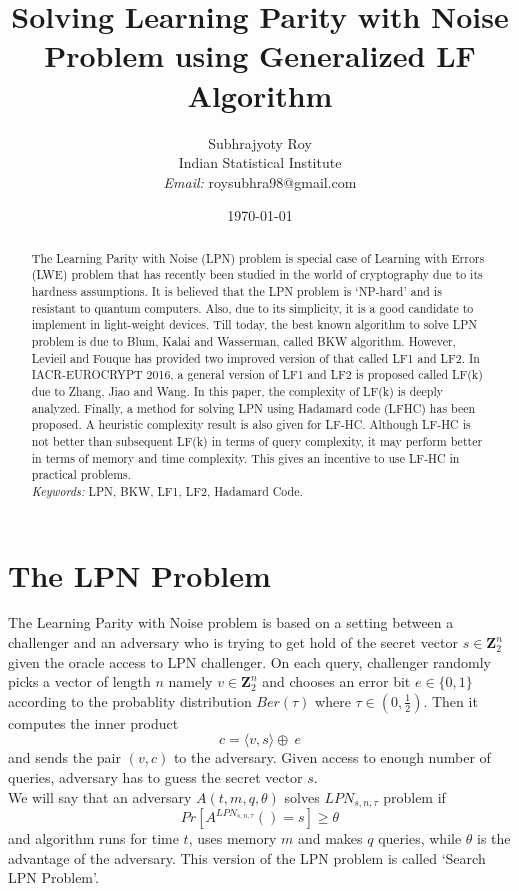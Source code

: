 \documentclass{article}
\title{Solving Learning Parity with Noise Problem using Generalized LF Algorithm}
\author{Subhrajyoty Roy\\
        Indian Statistical Institute\\
       \emph{Email:} roysubhra98@gmail.com}
\date{\today}
\begin{document}
	\maketitle

\begin{abstract}
	The Learning Parity with Noise (LPN) problem is special case of Learning with Errors (LWE) problem that has recently been studied in the world of cryptography due to its hardness assumptions. It is believed that the LPN problem is `NP-hard' and is resistant to quantum computers. Also, due to its simplicity, it is a good candidate to implement in light-weight devices.
	Till today, the best known algorithm to solve LPN problem is due to Blum, Kalai and Wasserman, called BKW algorithm. However, Levieil and Fouque has provided two improved version of that called LF1 and LF2. In IACR-EUROCRYPT 2016, a general version of LF1 and LF2 is proposed called LF(k) due to Zhang, Jiao and Wang. In this paper, the complexity of LF(k) is deeply analyzed. Finally, a method for solving LPN using Hadamard code (LFHC) has been proposed. A heuristic complexity result is also given for LF-HC. Although LF-HC is not better than subsequent LF(k) in terms of query complexity, it may perform better in terms of memory and time complexity. This gives an incentive to use LF-HC in practical problems.\\
	
	\emph{Keywords:} LPN, BKW, LF1, LF2, Hadamard Code.
	
\end{abstract}

\section{The LPN Problem}

  The Learning Parity with Noise problem is based on a setting between a challenger and an adversary who is trying to get hold of the secret vector $s\in \mathbf{Z}_2^n$ given the oracle access to LPN challenger. On each query, challenger randomly picks a vector of length $n$ namely $v\in \mathbf{Z}_2^n$ and chooses an error bit $e\in \{0,1\}$ according to the probablity distribution $Ber(\tau)$ where $\tau \in (0, \frac{1}{2})$. Then it computes the inner product $$c= \langle v,s\rangle\oplus\ e$$ and sends the pair $(v,c)$ to the adversary. Given access to enough number of queries, adversary has to guess the secret vector $s$.\\
  
  We will say that an adversary $A(t,m,q, \theta)$ solves $LPN_{s,n,\tau}$ problem if $$Pr[A^{LPN_{s,n,\tau}} ()=s]\geq\theta$$ and algorithm runs for time $t$, uses memory $m$ and makes $q$ queries, while $\theta$ is the advantage of the adversary. This version of the LPN problem is called `Search LPN Problem'.\\
  
\end{document}
